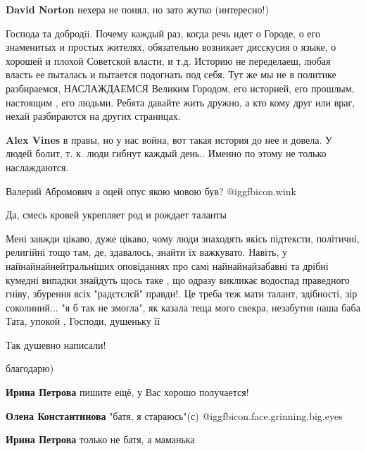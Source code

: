\begin{itemize}
\begin{itemize}
\begin{itemize}
\textbf{David Norton} нехера не понял, но зато жутко (интересно!)
\end{itemize} %


Господа та добродii. Почему каждый раз, когда речь идет о Городе, о его
знаменитых и простых жителях, обязательно возникает дисскусия о языке, о
хорошей и плохой Советской власти, и т.д. Историю не переделаеш, любая власть
ее пыталась и пытается подогнать под себя. Тут же мы не в политике разбираемся,
НАСЛАЖДАЕМСЯ Великим Городом, его историей, его прошлым, настоящим , его
людьми. Ребята давайте жить дружно, а кто кому друг или враг, нехай разбираются
на других страницах. 

\begin{itemize} %
\textbf{Alex Vines} в правы, но у нас война, вот такая история до нее и довела. У людей болит, т. к. люди гибнут каждый день.. Именно по этому не только наслаждаются.
\end{itemize} %

Валерий Абромович а оцей опус якою мовою був?  @igg{fbicon.wink} 

\end{itemize} %

Да, смесь кровей укрепляет род и рождает таланты


Мені завжди цікаво, дуже цікаво, чому люди знаходять якісь підтексти,
політичні, религійні тощо там, де, здавалось, знайти їх важкувато. Навіть, у
найнайнайнейтральніших оповіданнях про самі найнайнайзабавні та дрібні кумедні
випадки знайдуть щось таке , що одразу викликає водоспад праведного гніву,
збурення всіх "радєтєлєй" правди!. Це треба теж мати талант, здібності, зір
соколиний... "я б так не змогла", як казала теща мого свекра, незабутня наша
баба Тата, упокой , Господи, душеньку її


Так душевно написали!

\begin{itemize} %
благодарю)

\textbf{Ирина Петрова} пишите ещё, у Вас хорошо получается!

\textbf{Олена Константинова} "батя, я стараюсь"(с)  @igg{fbicon.face.grinning.big.eyes} 

\textbf{Ирина Петрова} только не батя, а маманька
\end{itemize} %


\end{itemize}
